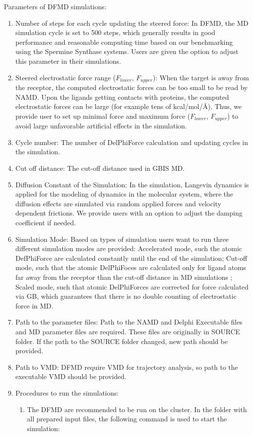 \documentclass[9pt,tutorial]{livecoms}
\begin{document}
Parameters of DFMD simulations:
\begin{enumerate}
\item Number of steps for each cycle updating the steered force: In DFMD, the MD simulation cycle is set to 500 steps, which generally results in good performance and reasonable computing time based on our benchmarking using the Spermine Synthase systems. Users are given the option to adjust this parameter in their simulations.
\item Steered electrostatic force range ($ F_{lower} $, $ F_{upper} $): When the target is away from the receptor, the computed electrostatic forces can be too small to be read by NAMD. Upon the ligands getting contacts with proteins, the computed electrostatic forces can be large (for example tens of kcal/mol/Å). Thus, we provide user to set up minimal force and maximum force ($ F_{lower} $, $ F_{upper}$) to avoid large unfavorable artificial effects in the simulation.
\item Cycle number: The number of DelPhiForce calculation and updating cycles in the simulation.
\item Cut off distance: The cut-off distance used in GBIS MD.
\item Diffusion Constant of the Simulation: In the simulation, Langevin dynamics is applied for the modeling of dynamics in the molecular system, where the diffusion effects are simulated via random applied forces and velocity dependent frictions. We provide users with an option to adjust the damping coefficient if needed.
\item Simulation Mode: Based on types of simulation users want to run three different simulation modes are provided: Accelerated mode, such the atomic DefPhiForce are calculated constantly until the end of the simulation; Cut-off mode, such that the atomic DelPhiFoces are calculated only for ligand atoms far away from the receptor than the cut-off distance in MD simulations ; Scaled mode, such that atomic DelPhiForces are corrected for force calculated via GB, which guarantees that there is no double counting of electrostatic force in MD.
\item Path to the parameter files: Path to the NAMD and Delphi Executable files and MD parameter files are required. These files are originally in SOURCE folder. If the path to the SOURCE folder changed, new path should be provided.
\item Path to VMD: DFMD require VMD for trajectory analysis, so path to the executable VMD should be provided.
\item 
Procedures to run the simulations:
\begin{enumerate}
\item The DFMD are recommended to be run on the cluster.  In the folder with all prepared input files, the following command is used to start the simulation:


\end{enumerate}
\end{enumerate}
\end{document}
